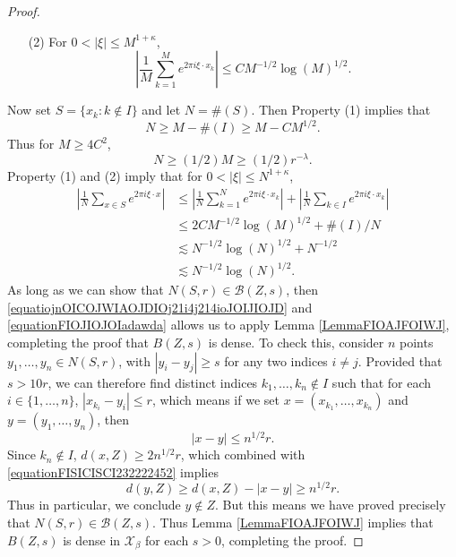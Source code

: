 \documentclass[dvipsnames,letterpaper,12pt]{article}
\numberwithin{equation}{section}
\numberwithin{theorem}{section}
\begin{document}
\begin{proof}
\begin{itemize}
        \item[(2)] For $0 < |\xi| \leq M^{1 + \kappa}$,
        \[ \left| \frac{1}{M} \sum_{k = 1}^M e^{2 \pi i \xi \cdot x_k} \right| \leq C M^{-1/2} \log(M)^{1/2}. \]
    \end{itemize}
    Now set $S = \{ x_k : k \not \in I \}$ and let $N = \#(S)$. Then Property (1) implies that
    \begin{equation}
        N \geq M - \#(I) \geq M - C M^{1/2}.
    \end{equation}
    Thus for $M \geq 4C^2$,
    \begin{equation} \label{equatiojnOICOJWIAOJDIOj21i4j214ioJOIJIOJD}
        N \geq (1/2) M \geq (1/2) r^{-\lambda}.
    \end{equation}
    Property (1) and (2) imply that for $0 < |\xi| \leq N^{1 + \kappa}$,
    \begin{equation} \label{equationFIOJIOJOIadawda}
    \begin{split}
        \left| \frac{1}{N} \sum_{x \in S} e^{2 \pi i \xi \cdot x} \right| &\leq \left| \frac{1}{N} \sum_{k = 1}^N e^{2 \pi i \xi \cdot x_k} \right| + \left| \frac{1}{N} \sum_{k \in I} e^{2 \pi i \xi \cdot x_k} \right|\\
        &\leq 2C M^{-1/2} \log(M)^{1/2} + \#(I)/N \\
        &\lesssim N^{-1/2} \log(N)^{1/2} + N^{-1/2}\\
        &\lesssim N^{-1/2} \log(N)^{1/2}.
    \end{split}
    \end{equation}
    As long as we can show that $N(S,r) \in \mathcal{B}(Z,s)$, then \eqref{equatiojnOICOJWIAOJDIOj21i4j214ioJOIJIOJD} and \eqref{equationFIOJIOJOIadawda} allows us to apply Lemma \ref{LemmaFIOAJFOIWJ}, completing the proof that $B(Z,s)$ is dense. To check this, consider $n$ points $y_1,\dots,y_n \in N(S,r)$, with $|y_i - y_j| \geq s$ for any two indices $i \neq j$. Provided that $s > 10r$, we can therefore find distinct indices $k_1, \dots, k_n \not \in I$ such that for each $i \in \{ 1, \dots, n \}$, $|x_{k_i} - y_i| \leq r$, which means if we set $x = (x_{k_1}, \dots, x_{k_n})$ and $y = (y_1, \dots, y_n)$, then
    \begin{equation} \label{equationFISICISCI232222452}
        |x - y| \leq n^{1/2} r.
    \end{equation}
    Since $k_n \not \in I$, $d(x,Z) \geq 2n^{1/2}r$, which combined with \eqref{equationFISICISCI232222452} implies
    \begin{equation} \label{equationSICSICI}
        d(y,Z) \geq d(x,Z) - |x - y| \geq n^{1/2} r.
    \end{equation}
    Thus in particular, we conclude $y \not \in Z$. But this means we have proved precisely that $N(S,r) \in \mathcal{B}(Z,s)$. Thus Lemma \ref{LemmaFIOAJFOIWJ} implies that $B(Z,s)$ is dense in $\mathcal{X}_\beta$ for each $s > 0$, completing the proof.
\end{proof}
\end{document}

